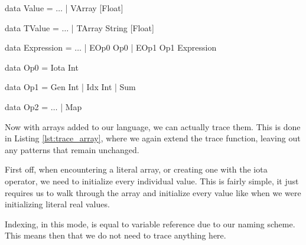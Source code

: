         \begin{haskell}[caption=Adding arrays, label=lst:language_array, gobble=12]
            data Value = $\ldots$ | VArray [Float]
                
            data TValue = $\ldots$ | TArray String [Float]

            data Expression
                = $\ldots$
                | EOp0 Op0
                | EOp1 Op1 Expression

            data Op0 = Iota Int
            
            data Op1 = Gen Int | Idx Int | Sum

            data Op2 = $\ldots$ | Map
        \end{haskell}

        Now with arrays added to our language, we can actually trace them.
        This is done in Listing \ref{lst:trace_array}, where we again extend the trace function, leaving out any patterns that remain unchanged.
        
        First off, when encountering a literal array, or creating one with the iota operator, we need to initialize every individual value.
        This is fairly simple, it just requires us to walk through the array and initialize every value like when we were initializing literal real values.

        Indexing, in this mode, is equal to variable reference due to our naming scheme.
        This means then that we do not need to trace anything here.

